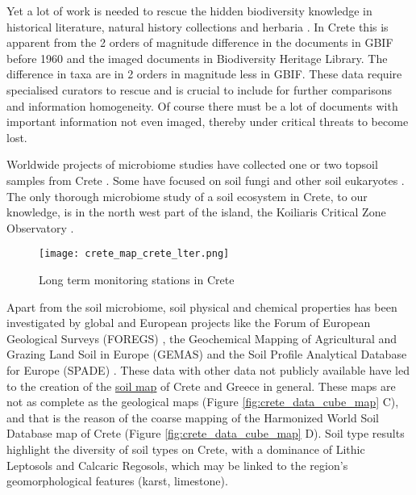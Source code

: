 Yet a lot of work is needed to rescue the hidden biodiversity knowledge in
historical literature, natural history collections and herbaria \parencite{Paragkamian2022}.
In Crete this is apparent from the 2 orders of magnitude difference in the documents
in GBIF before 1960 and the imaged documents in Biodiversity Heritage Library. The 
difference in taxa are in 2 orders in magnitude less in GBIF. These data 
require specialised curators to rescue and is crucial to include for 
further comparisons and information homogeneity. Of course there must be 
a lot of documents with important information not even imaged, thereby under 
critical threats to become lost.

Worldwide projects of microbiome studies have collected one or two topsoil
samples from Crete \parencite{Vasar2022, Labouyrie2023, Bahram2018, Orgiazzi2018}.
Some have focused on soil fungi \parencite{Mikryukov2023, Davison2021, Tedersoo2021}
and other soil eukaryotes \parencite{Aslani2022}.
The only thorough microbiome study of a soil ecosystem in Crete, to our knowledge,
is in the north west part of the island, the Koiliaris Critical Zone Observatory \parencite{tsiknia2014}.

\begin{figure}[hbt!] 
    \centering\texttt{[image: crete\_map\_crete\_lter.png]}
    \caption[LTERs in Crete]{Long term monitoring stations in Crete}
    \label{fig:crete-lter}
\end{figure}

Apart from the soil microbiome, soil physical and chemical properties has been
investigated by global and European projects like the Forum of European Geological Surveys
(FOREGS) \parencite{nerc19017}, the Geochemical Mapping of Agricultural and Grazing Land
Soil in Europe (GEMAS) \parencite{REIMANN2018302} and the Soil Profile Analytical
Database for Europe (SPADE) \parencite{Hiederer2006}. These data with other data
not publicly available have led to the creation of the \href{https://esdac.jrc.ec.europa.eu/content/soil-map-greece-0}{soil map} of Crete 
and Greece in general. These maps are not as complete as the geological maps (Figure \ref{fig:crete_data_cube_map} C), 
and that is the reason of the coarse mapping of the Harmonized World Soil Database map of Crete (Figure \ref{fig:crete_data_cube_map} D).
Soil type results highlight the diversity of soil types on Crete, with a
dominance of Lithic Leptosols and Calcaric Regosols, which may be linked to the
region's geomorphological features (karst, limestone).

